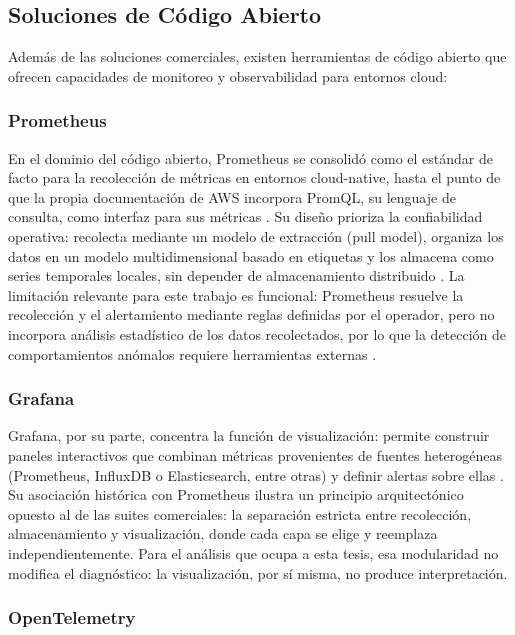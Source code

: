 \subsection{Soluciones de Código Abierto}

Además de las soluciones comerciales, existen herramientas de código abierto que ofrecen capacidades de monitoreo y observabilidad para entornos cloud:

\subsubsection{Prometheus}

En el dominio del código abierto, Prometheus se consolidó como el estándar de facto para la recolección de métricas en entornos cloud-native, hasta el punto de que la propia documentación de AWS incorpora PromQL, su lenguaje de consulta, como interfaz para sus métricas \parencite{AWS2026}. Su diseño prioriza la confiabilidad operativa: recolecta mediante un modelo de extracción (pull model), organiza los datos en un modelo multidimensional basado en etiquetas y los almacena como series temporales locales, sin depender de almacenamiento distribuido \parencite{Prometheus2026}. La limitación relevante para este trabajo es funcional: Prometheus resuelve la recolección y el alertamiento mediante reglas definidas por el operador, pero no incorpora análisis estadístico de los datos recolectados, por lo que la detección de comportamientos anómalos requiere herramientas externas \parencite{Prometheus2026}.

\subsubsection{Grafana}

Grafana, por su parte, concentra la función de visualización: permite construir paneles interactivos que combinan métricas provenientes de fuentes heterogéneas (Prometheus, InfluxDB o Elasticsearch, entre otras) y definir alertas sobre ellas \parencite{Grafana2026}. Su asociación histórica con Prometheus ilustra un principio arquitectónico opuesto al de las suites comerciales: la separación estricta entre recolección, almacenamiento y visualización, donde cada capa se elige y reemplaza independientemente. Para el análisis que ocupa a esta tesis, esa modularidad no modifica el diagnóstico: la visualización, por sí misma, no produce interpretación.

\subsubsection{OpenTelemetry}

